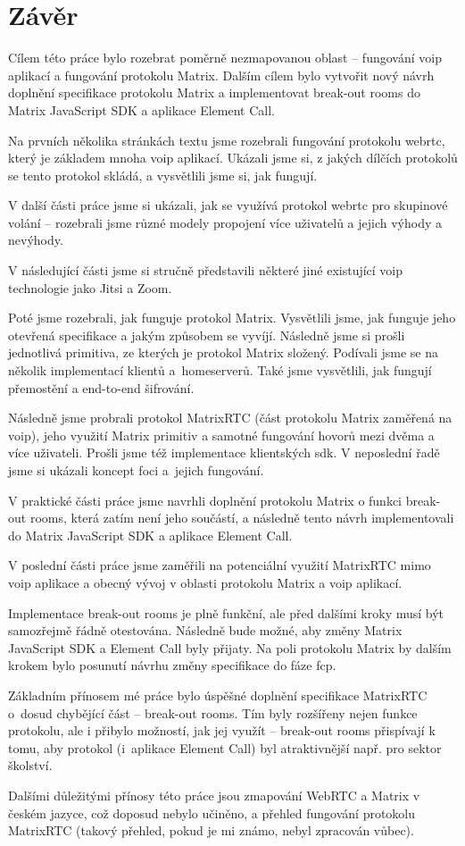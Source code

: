 \section{Závěr}

Cílem této práce bylo rozebrat poměrně nezmapovanou oblast -- fungování
\gls{voip} aplikací a fungování protokolu Matrix. Dalším cílem bylo vytvořit
nový návrh doplnění specifikace protokolu Matrix a implementovat break-out rooms
do Matrix JavaScript SDK a aplikace Element Call.

Na prvních několika stránkách textu jsme rozebrali fungování protokolu
\gls{webrtc}, který je základem mnoha \gls{voip} aplikací. Ukázali jsme si, z
jakých dílčích protokolů se tento protokol skládá, a vysvětlili jsme si, jak
fungují.

V další části práce jsme si ukázali, jak se využívá protokol \gls{webrtc} pro
skupinové volání -- rozebrali jsme různé modely propojení více uživatelů a
jejich výhody a nevýhody.

V následující části jsme si stručně představili některé jiné existující
\gls{voip} technologie jako Jitsi a Zoom.

Poté jsme rozebrali, jak funguje protokol Matrix. Vysvětlili jsme, jak funguje
jeho otevřená specifikace a jakým způsobem se vyvíjí. Následně jsme si prošli
jednotlivá primitiva, ze kterých je protokol Matrix složený. Podívali jsme se na
několik implementací klientů a~homeserverů. Také jsme vysvětlili, jak fungují
přemostění a end-to-end šifrování.

Následně jsme probrali protokol MatrixRTC (část protokolu Matrix zaměřená na
\gls{voip}), jeho využití Matrix primitiv a samotné fungování hovorů mezi dvěma
a více uživateli. Prošli jsme též implementace klientských \gls{sdk}. V
neposlední řadě jsme si ukázali koncept foci a~jejich fungování.

V praktické části práce jsme navrhli doplnění protokolu Matrix o funkci
break-out rooms, která zatím není jeho součástí, a následně tento návrh
implementovali do Matrix JavaScript SDK a aplikace Element Call.

V poslední části práce jsme zaměřili na potenciální využití MatrixRTC mimo
\gls{voip} aplikace a obecný vývoj v oblasti protokolu Matrix a \gls{voip}
aplikací.

Implementace break-out rooms je plně funkční, ale před dalšími kroky musí být
samozřejmě řádně otestována. Následně bude možné, aby změny Matrix JavaScript
SDK a Element Call byly přijaty. Na poli protokolu Matrix by dalším krokem bylo
posunutí návrhu změny specifikace do fáze \gls{fcp}.

Základním přínosem mé práce bylo úspěšné doplnění specifikace MatrixRTC o~dosud
chybějící část -- break-out rooms. Tím byly rozšířeny nejen funkce protokolu,
ale i přibylo možností, jak jej využít -- break-out rooms přispívají k tomu, aby
protokol (i~aplikace Element Call) byl atraktivnější např. pro sektor školství.

Dalšími důležitými přínosy této práce jsou zmapování WebRTC a Matrix v českém
jazyce, což doposud nebylo učiněno, a přehled fungování protokolu MatrixRTC
(takový přehled, pokud je mi známo, nebyl zpracován vůbec).
